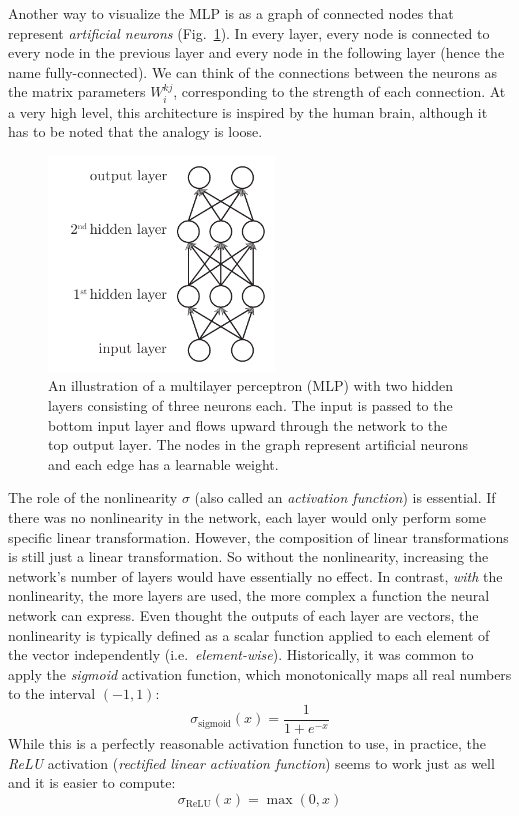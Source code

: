 \documentclass[12pt]{article}
\begin{document}
Another way to visualize the MLP is as a graph of connected nodes that represent \textit{artificial neurons} (Fig.\ \ref{fig_mlp}). In every layer, every node is connected to every node in the previous layer and every node in the following layer (hence the name fully-connected). We can think of the connections between the neurons as the matrix parameters $W_i^{kj}$, corresponding to the strength of each connection. At a very high level, this architecture is inspired by the human brain, although it has to be noted that the analogy is loose.

\begin{figure}[H]
\centering
\includegraphics[width=6cm]{illustrations/mlp.pdf}
\caption{An illustration of a multilayer perceptron (MLP) with two hidden layers consisting of three neurons each. The input is passed to the bottom input layer and flows upward through the network to the top output layer. The nodes in the graph represent artificial neurons and each edge has a learnable weight.}
\label{fig_mlp}
\end{figure}

The role of the nonlinearity $\sigma$ (also called an \textit{activation function}) is essential. If there was no nonlinearity in the network, each layer would only perform some specific linear transformation. However, the composition of linear transformations is still just a linear transformation. So without the nonlinearity, increasing the network's number of layers would have essentially no effect. In contrast, \textit{with} the nonlinearity, the more layers are used, the more complex a function the neural network can express. Even thought the outputs of each layer are vectors, the nonlinearity is typically defined as a scalar function applied to each element of the vector independently (i.e.\ \textit{element-wise}). Historically, it was common to apply the \textit{sigmoid} activation function, which monotonically maps all real numbers to the interval $(-1, 1)$:
\begin{equation}
\sigma_{\textrm{sigmoid}}(x) = \frac{1}{1 + e^{-x}}
\end{equation}
While this is a perfectly reasonable activation function to use, in practice, the \textit{ReLU} activation (\textit{rectified linear activation function}) seems to work just as well and it is easier to compute:
\begin{equation}
\sigma_{\textrm{ReLU}}(x) = \max(0, x)
\end{equation}
\end{document}
